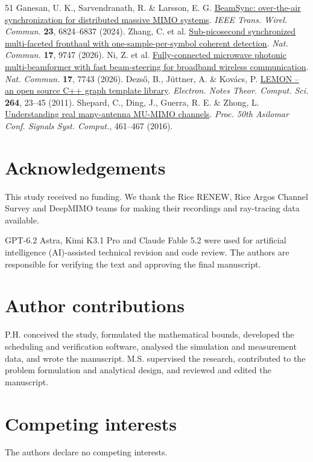\documentclass[11pt,letterpaper]{article}
\begin{document}
\begin{thebibliography}{51}
 Ganesan, U. K., Sarvendranath, R. \& Larsson, E. G. \href{https://doi.org/10.1109/TWC.2023.3335089}{BeamSync: over-the-air synchronization for distributed massive MIMO systems}. \emph{IEEE Trans. Wirel. Commun.} \textbf{23}, 6824–6837 (2024).
 Zhang, C. et al. \href{https://doi.org/10.1038/s41467-026-76739-2}{Sub-picosecond synchronized multi-faceted fronthaul with one-sample-per-symbol coherent detection}. \emph{Nat. Commun.} \textbf{17}, 9747 (2026).
 Ni, Z. et al. \href{https://doi.org/10.1038/s41467-026-74485-z}{Fully-connected microwave photonic multi-beamformer with fast beam-steering for broadband wireless communication}. \emph{Nat. Commun.} \textbf{17}, 7743 (2026).
 Dezső, B., Jüttner, A. \& Kovács, P. \href{https://doi.org/10.1016/j.entcs.2011.06.003}{LEMON – an open source C++ graph template library}. \emph{Electron. Notes Theor. Comput. Sci.} \textbf{264}, 23–45 (2011).
 Shepard, C., Ding, J., Guerra, R. E. \& Zhong, L. \href{https://doi.org/10.1109/ACSSC.2016.7869082}{Understanding real many-antenna MU-MIMO channels}. \emph{Proc. 50th Asilomar Conf. Signals Syst. Comput.}, 461–467 (2016).
\end{thebibliography}
\section*{Acknowledgements}
This study received no funding. We thank the Rice RENEW, Rice Argos Channel Survey and DeepMIMO teams for making their recordings and ray-tracing data available.

GPT-6.2 Astra, Kimi K3.1 Pro and Claude Fable 5.2 were used for artificial intelligence (AI)-assisted technical revision and code review. The authors are responsible for verifying the text and approving the final manuscript.
\section*{Author contributions}
P.H. conceived the study, formulated the mathematical bounds, developed the scheduling and verification software, analysed the simulation and measurement data, and wrote the manuscript. M.S. supervised the research, contributed to the problem formulation and analytical design, and reviewed and edited the manuscript.

\section*{Competing interests}
The authors declare no competing interests.
\end{document}
